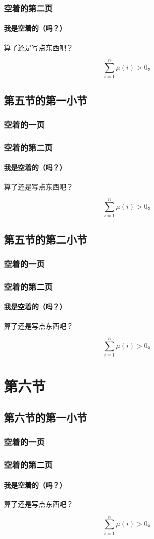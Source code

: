 \documentclass{../pkslide}
\begin{document}
\begin{frame}
  \frametitle{空着的第二页}
  \framesubtitle{我是空着的（吗？）}
  
  算了还是写点东西吧？
  
  \[ \sum_{i = 1}^{n} \mu(i) > 0 \text{。} \]
\end{frame}

\subsection{第五节的第一小节}

\begin{frame}
  \frametitle{空着的一页}
\end{frame}

\begin{frame}
  \frametitle{空着的第二页}
  \framesubtitle{我是空着的（吗？）}
  
  算了还是写点东西吧？
  
  \[ \sum_{i = 1}^{n} \mu(i) > 0 \text{。} \]
\end{frame}

\subsection{第五节的第二小节}

\begin{frame}
  \frametitle{空着的一页}
\end{frame}

\begin{frame}
  \frametitle{空着的第二页}
  \framesubtitle{我是空着的（吗？）}
  
  算了还是写点东西吧？
  
  \[ \sum_{i = 1}^{n} \mu(i) > 0 \text{。} \]
\end{frame}

\section{第六节}

\subsection{第六节的第一小节}

\begin{frame}
  \frametitle{空着的一页}
\end{frame}

\begin{frame}
  \frametitle{空着的第二页}
  \framesubtitle{我是空着的（吗？）}
  
  算了还是写点东西吧？
  
  \[ \sum_{i = 1}^{n} \mu(i) > 0 \text{。} \]
\end{frame}
\end{document}
